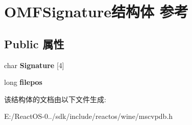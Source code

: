 \hypertarget{struct_o_m_f_signature}{}\section{O\+M\+F\+Signature结构体 参考}
\label{struct_o_m_f_signature}
\subsection*{Public 属性}
\begin{DoxyCompactItemize}
\item 
\mbox{\label{struct_o_m_f_signature_a0b793dbb9e7a55e8045d856427d05865}} 
char {\bfseries Signature} \mbox{[}4\mbox{]}
\item 
\mbox{\label{struct_o_m_f_signature_aa3a6cc2600522906e9f87bb216a270e9}} 
long {\bfseries filepos}
\end{DoxyCompactItemize}


该结构体的文档由以下文件生成\+:\begin{DoxyCompactItemize}
\item 
E\+:/\+React\+O\+S-\/0../sdk/include/reactos/wine/mscvpdb.\+h\end{DoxyCompactItemize}
